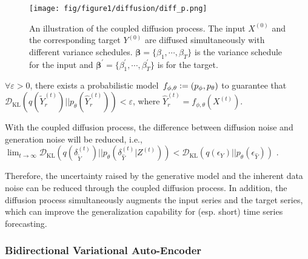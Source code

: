 \begin{figure}[t]
    \centering
    \begin{minipage}[t]{1.0\textwidth}
    \centering
    \texttt{[image: fig/figure1/diffusion/diff\_p.png]}
    \caption{
    An illustration of the coupled diffusion process.
    The input $X^{(0)}$ and the corresponding target $Y^{(0)}$ are diffused simultaneously with different variance schedules.
    $\bm{\beta} = \{ \beta_1, \cdots, \beta_T \}$ is the variance schedule for the input and $\bm{\beta}^{\prime} = \{ \beta_1^{\prime},  \cdots, \beta_T^{\prime} \}$ is for the target.
    }   \label{fig:diffusion_process}
    \end{minipage}
\end{figure}

\begin{lemma}  \label{theo1}
$ \forall \varepsilon > 0 $, 
there exists a probabilistic model $ \, f_{\phi, \theta} \vcentcolon = (p_{\phi}, p_{\theta})$ 
to guarantee that $ \mathcal{D}_{\mathrm{KL}} (q(\widetilde{Y}_r^{(t)}) || p_{\theta}(\widehat{Y}_r^{(t)})) < \varepsilon $, 
where $ \widehat{Y}_r^{(t)} = f_{\phi,\theta} (X^{(t)})  $. 
\end{lemma}

\begin{lemma} \label{theo2}
With the coupled diffusion process, 
the difference between  diffusion noise and  generation noise will be reduced, 
i.e., 
$ \lim_{t \rightarrow \infty} \mathcal{D}_{\mathrm{KL}} (q ({\delta_{\widetilde{Y}}^{(t)}}) || p_{\theta} (\delta_{\widehat{Y}}^{(t)} | Z^{(t)}) ) < 
\mathcal{D}_{\mathrm{KL}} (q(\epsilon_Y) || p_{\theta}(\epsilon_{\widehat{Y}}))$ . 
\end{lemma}

Therefore, the uncertainty raised by the generative model and the inherent data noise can be reduced through the coupled diffusion process. 
In addition, the diffusion process simultaneously augments the input series and the target series, which can improve the generalization capability for (esp. short) time series forecasting. 

\subsubsection{Bidirectional Variational Auto-Encoder}

